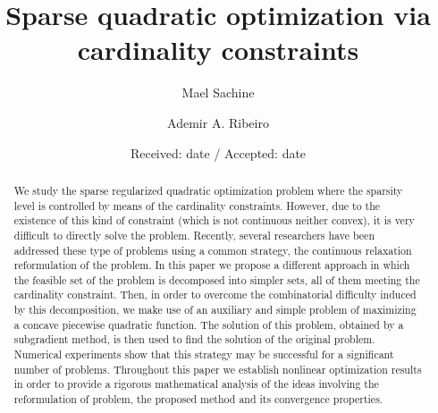 \documentclass[smallextended,referee,envcountsect]{svjour3}
\begin{document}
\title{Sparse quadratic optimization via cardinality constraints}


\author{Mael Sachine \and Ademir A. Ribeiro
}



\date{Received: date / Accepted: date}

\maketitle

\begin{abstract}
We study the sparse regularized quadratic optimization problem where the sparsity level 
is controlled by means of the cardinality constraints. However, due to the 
existence of this kind of constraint (which is not continuous neither convex), it is 
very difficult to directly solve the problem. Recently, several researchers have been 
addressed these type of problems using a common strategy, the continuous relaxation 
reformulation of the problem. In this paper we propose a different approach in which the 
feasible set of the problem is decomposed into simpler sets, all of them meeting the 
cardinality constraint. Then, in order to overcome the combinatorial difficulty induced 
by this decomposition, we make use of an auxiliary and simple problem of maximizing a 
concave piecewise quadratic function. The solution of this problem, obtained by a 
subgradient method, is then used to find the solution of the original problem. 
Numerical experiments show that this strategy may be successful for a significant 
number of problems. Throughout this paper we establish nonlinear optimization results 
in order to provide a rigorous mathematical analysis of the ideas involving the 
reformulation of problem, the proposed method and its convergence properties.
\end{abstract}
\end{document}
